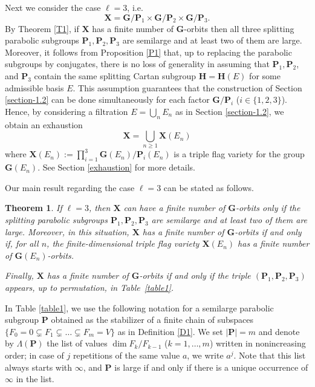 \documentclass[12pt]{amsart}
\newcommand{\G}{\mathbf{G}}
\renewcommand{\H}{\mathbf{H}}
\renewcommand{\P}{\mathbf{P}}
\newcommand{\X}{\mathbf{X}}
\newcommand{\length}[1]{|#1|}
\newcommand{\dims}[1]{\Lambda(#1)}
\numberwithin{equation}{section}
\newtheorem{theorem}{Theorem}[section]
\theoremstyle{definition}
\begin{document}
Next we consider the case $\ell=3$, i.e.
\[\X=\G/\P_1\times \G/\P_2\times \G/\P_3.\]
By Theorem \ref{T1},
if $\X$ has a finite number of $\G$-orbits then all three splitting parabolic subgroups $\P_1,\P_2,\P_3$ are semilarge and at least two of them are large.
Moreover, it follows from Proposition \ref{P1} that, up to replacing the parabolic subgroups by conjugates, there is no loss of generality in assuming that $\P_1,\P_2$, and $\P_3$ contain the same splitting Cartan subgroup $\H=\H(E)$ for some admissible basis $E$.
 This assumption guarantees that the construction of Section \ref{section-1.2} can be done simultaneously for each factor $\G/\P_i$ ($i\in\{1,2,3\}$). Hence,
 by considering a filtration $E=\bigcup_n E_n$ as in Section \ref{section-1.2}, we obtain an exhaustion 
\begin{equation}
\label{X-exhaustion}
\X=\bigcup_{n\geq 1}\X(E_n)
\end{equation}
where
$\X(E_n):=\prod_{i=1}^3 \G(E_n)/\P_i(E_n)$ is a triple flag variety for the group $\G(E_n)$. See Section \ref{exhaustion} for more details. 

Our main result regarding the case $\ell=3$ can be stated as follows.

\begin{theorem} 
\label{T2}
If $\ell=3$, then $\X$ can have a finite number of $\G$-orbits only if 
the splitting parabolic subgroups $\P_1,\P_2,\P_3$ are semilarge and at least two of them are large.
Moreover, in this situation, $\X$ has a finite number of $\G$-orbits if and only if, for all $n$, the finite-dimensional triple flag variety $\X(E_n)$ has a finite number of $\G(E_n)$-orbits.

Finally, $\X$ has a finite number of $\G$-orbits if and only if
the triple $(\P_1,\P_2,\P_3)$ appears, up to permutation, in Table~\ref{table1}.
\end{theorem}

In Table \ref{table1}, we use the following notation for a semilarge parabolic subgroup $\P$
obtained as the stabilizer of a finite chain of subspaces $\{F_0=0\subsetneq F_1\subsetneq\ldots\subsetneq F_m=V\}$ as in Definition \ref{D1}. 
We set $\length{\P}=m$
and denote by $\dims{\P}$ the list of values $\dim F_k/F_{k-1}$ ($k=1,\ldots,m$) written in nonincreasing order; in case of $j$ repetitions of the same value $a$, we write $a^j$. Note that this list always starts with $\infty$, and $\P$ is large if and only if there is a unique occurrence of $\infty$ in the list.
\end{document}
